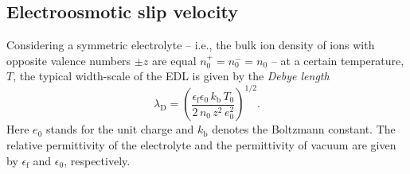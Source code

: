 \begin{versiona}
\subsection{Electroosmotic slip velocity}\label{EOF}
Considering a symmetric electrolyte -- i.e., the bulk ion density of ions with opposite valence numbers $\pm z$ are equal $n^{+}_{0}=n^{-}_{0}=n_{0}$ --  at a certain temperature, $T$, the typical width-scale of the EDL is given by the \textit{Debye length} \cite{KarBes:2001}
\begin{equation}\label{ek:debye}
\lambda_{\mathrm{D}} = \left(\dfrac{\epsilon_{\mathrm{f}}\epsilon_{0}\,k_{\mathrm{b}}\,T_{0}}{2\, n_{0}\, z^{2}\, e^{2}_{0} }\right)^{1/2}.
\end{equation}
Here $e_{0}$ stands for the unit charge and $k_{\mathrm{b}}$ denotes the Boltzmann constant. The relative permittivity of the electrolyte and the permittivity of vacuum are given by $\epsilon_{\mathrm{f}}$ and $\epsilon_{0}$, respectively. 



\end{versiona}
